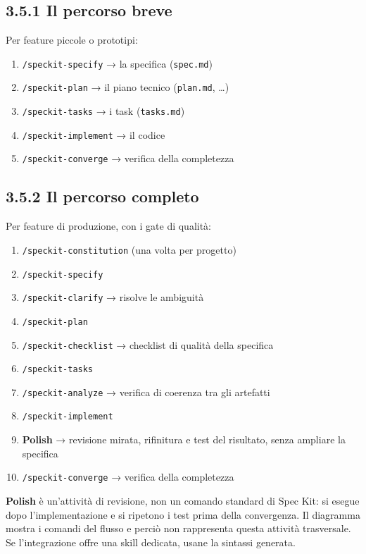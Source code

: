 \documentclass[
  italian,
  10pt,
]{book}
\providecommand{\tightlist}{%
  \setlength{\itemsep}{0pt}\setlength{\parskip}{0pt}}
\begin{document}
\subsection{3.5.1 Il percorso breve}\label{il-percorso-breve}

Per feature piccole o prototipi:

\begin{enumerate}
\def\labelenumi{\arabic{enumi}.}
\tightlist
\item
  \texttt{/speckit-specify} → la specifica (\texttt{spec.md})
\item
  \texttt{/speckit-plan} → il piano tecnico (\texttt{plan.md}, \ldots)
\item
  \texttt{/speckit-tasks} → i task (\texttt{tasks.md})
\item
  \texttt{/speckit-implement} → il codice
\item
  \texttt{/speckit-converge} → verifica della completezza
\end{enumerate}

\subsection{3.5.2 Il percorso completo}\label{il-percorso-completo}

Per feature di produzione, con i gate di qualità:

\begin{enumerate}
\def\labelenumi{\arabic{enumi}.}
\tightlist
\item
  \texttt{/speckit-constitution} (una volta per progetto)
\item
  \texttt{/speckit-specify}
\item
  \texttt{/speckit-clarify} → risolve le ambiguità
\item
  \texttt{/speckit-plan}
\item
  \texttt{/speckit-checklist} → checklist di qualità della specifica
\item
  \texttt{/speckit-tasks}
\item
  \texttt{/speckit-analyze} → verifica di coerenza tra gli artefatti
\item
  \texttt{/speckit-implement}
\item
  \textbf{Polish} → revisione mirata, rifinitura e test del risultato,
  senza ampliare la specifica
\item
  \texttt{/speckit-converge} → verifica della completezza
\end{enumerate}

\textbf{Polish} è un'attività di revisione, non un comando standard di
Spec Kit: si esegue dopo l'implementazione e si ripetono i test prima
della convergenza. Il diagramma mostra i comandi del flusso e perciò non
rappresenta questa attività trasversale. Se l'integrazione offre una
skill dedicata, usane la sintassi generata.
\end{document}
